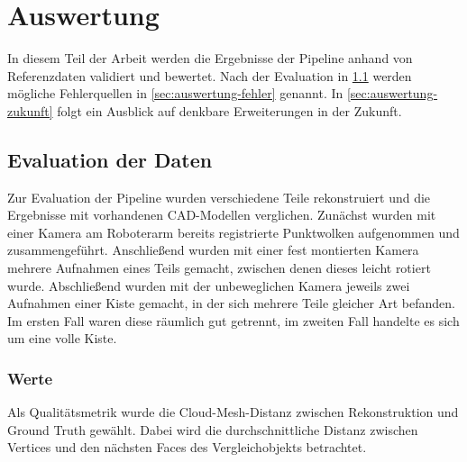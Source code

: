 
\chapter{Auswertung}
\label{ch:auswertung}

In diesem Teil der Arbeit werden die Ergebnisse der Pipeline anhand von Referenzdaten validiert und bewertet.
Nach der Evaluation in \ref{sec:auswertung-daten} werden mögliche Fehlerquellen in \ref{sec:auswertung-fehler} genannt.
In \ref{sec:auswertung-zukunft} folgt ein Ausblick auf denkbare Erweiterungen in der Zukunft.



\section{Evaluation der Daten}
\label{sec:auswertung-daten}

Zur Evaluation der Pipeline wurden verschiedene Teile rekonstruiert und die Ergebnisse mit vorhandenen CAD-Modellen verglichen.
Zunächst wurden mit einer Kamera am Roboterarm bereits registrierte Punktwolken aufgenommen und zusammengeführt.
Anschließend wurden mit einer fest montierten Kamera mehrere Aufnahmen eines Teils gemacht, zwischen denen dieses leicht rotiert wurde.
Abschließend wurden mit der unbeweglichen Kamera jeweils zwei Aufnahmen einer Kiste gemacht, in der sich mehrere Teile gleicher Art befanden.
Im ersten Fall waren diese räumlich gut getrennt, im zweiten Fall handelte es sich um eine volle Kiste.


\subsection{Werte}
\label{subsec:auswertung-daten-werte}

Als Qualitätsmetrik wurde die Cloud-Mesh-Distanz zwischen Rekonstruktion und Ground Truth gewählt.
Dabei wird die durchschnittliche Distanz zwischen Vertices und den nächsten Faces des Vergleichobjekts betrachtet.

